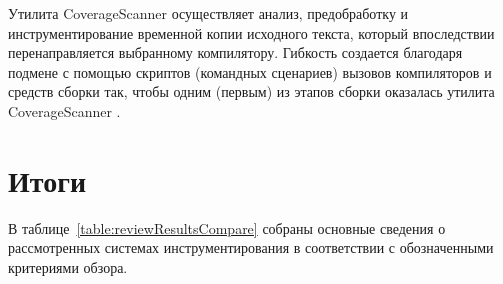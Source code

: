 Утилита CoverageScanner осуществляет анализ, предобработку и инструментирование временной копии исходного текста, который впоследствии перенаправляется выбранному компилятору. Гибкость создается благодаря подмене с помощью скриптов (командных сценариев) вызовов компиляторов и средств сборки так, чтобы одним (первым) из этапов сборки оказалась утилита CoverageScanner \cite{reviewFrog}.

\section{Итоги}

В таблице~\ref{table:reviewResultsCompare} собраны основные сведения о рассмотренных системах инструментирования в соответствии с обозначенными критериями обзора.
\begin{table}[htbp]
  \centering
  \captionsetup{skip=5pt}
  \caption{Основные характеристики систем инструментирования.}
\end{table}

